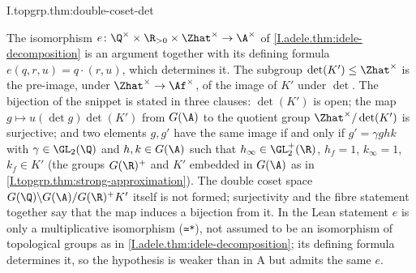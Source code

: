 \begin{tfformal}{I.topgrp.thm:double-coset-det}
\begin{tffidelity}
The isomorphism $e\colon\Q^\times\times\R_{>0}\times\Zhat^\times\to\A^\times$ of \cref{I.adele.thm:idele-decomposition} is an argument together with its defining formula $e(q,r,u)=q\cdot(r,u)$, which determines it. The subgroup $\det(K')\le\Zhat^\times$ is the pre-image, under $\Zhat^\times\to\Af^\times$, of the image of $K'$ under $\det$. The bijection of the snippet is stated in three clauses: $\det(K')$ is open; the map $g\mapsto u(\det g)\det(K')$ from $G(\A)$ to the quotient group $\Zhat^\times/\det(K')$ is surjective; and two elements $g,g'$ have the same image if and only if $g'=\gamma g h k$ with $\gamma\in\GL_2(\Q)$ and $h,k\in G(\A)$ such that $h_\infty\in\GL_2^+(\R)$, $h_f=1$, $k_\infty=1$, $k_f\in K'$ (the groups $G(\R)^+$ and $K'$ embedded in $G(\A)$ as in \cref{I.topgrp.thm:strong-approximation}). The double coset space $G(\Q)\backslash G(\A)/G(\R)^+K'$ itself is not formed; surjectivity and the fibre statement together say that the map induces a bijection from it. In the Lean statement $e$ is only a multiplicative isomorphism (\texttt{≃*}), not assumed to be an isomorphism of topological groups as in \cref{I.adele.thm:idele-decomposition}; its defining formula determines it, so the hypothesis is weaker than in A but admits the same $e$.
\end{tffidelity}
\end{tfformal}
